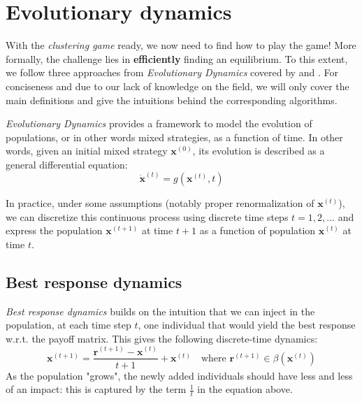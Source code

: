 \documentclass[11pt,a4paper]{article}
\begin{document}
\section{Evolutionary dynamics}
\label{sec:evo-dyn}

With the \textit{clustering game} ready, we now need to find how to play the game! More formally, the challenge lies in \textbf{efficiently} finding an equilibrium. To this extent, we follow three approaches from \textit{Evolutionary Dynamics} covered by \cite{bulo-thesis} and \cite{game-clustering}. For conciseness and due to our lack of knowledge on the field, we will only cover the main definitions and give the intuitions behind the corresponding algorithms.

\textit{Evolutionary Dynamics} provides a framework to model the evolution of populations, or in other words mixed strategies, as a function of time. In other words, given an initial mixed strategy $\mathbf{x}^{(0)}$, its evolution  is described as a general differential equation: 
\begin{equation}
    \dot{\mathbf{x}}^{(t)} = g(\mathbf{x}^{(t)}, t)
\end{equation}

In practice, under some assumptions (notably proper renormalization of $\mathbf{x}^{(t)}$), we can discretize this continuous process using discrete time steps $t=1, 2, \ldots$ and express the population $\mathbf{x}^{(t+1)}$ at time $t+1$ as a function of population $\mathbf{x}^{(t)}$ at time $t$.

\subsection*{Best response dynamics}
\textit{Best response dynamics} builds on the intuition that we can inject in the population, at each time step $t$, one individual that would yield the best response w.r.t. the payoff matrix. This gives the following discrete-time dynamics:
\begin{equation}
    \label{eq:best-response}
    \mathbf{x}^{(t+1)} = \frac{ \mathbf{r}^{(t+1)} -  \mathbf{x}^{(t)}}{t + 1} + \mathbf{x}^{(t)} \quad \text{where } \mathbf{r}^{(t+1)}\in\beta(\mathbf{x}^{(t)})
\end{equation}
As the population "grows", the newly added individuals should have less and less of an impact: this is captured by the term $\frac{1}{t}$ in the equation above.
\end{document}

